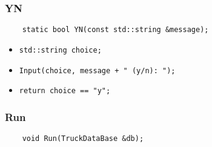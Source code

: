 \subsubsection*{YN}

\begin{lstlisting}
	static bool YN(const std::string &message);
\end{lstlisting}

\begin{itemize}
	\item \verb|std::string choice;|
	\item \verb|Input(choice, message + " (y/n): ");|
	\item \verb|return choice == "y";|
\end{itemize}


\subsubsection*{Run}

\begin{lstlisting}
	void Run(TruckDataBase &db);
\end{lstlisting}

